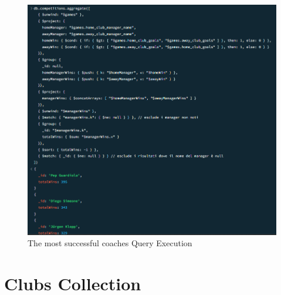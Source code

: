 \documentclass{Configuration_Files/PoliMi3i_thesis}
\begin{document}
\begin{figure}[htbp]
    \centering
    \includegraphics[scale=0.8]{Images/Queries/Competitions/most_succesful_coaches/msc.png}
    \caption{The most successful coaches Query Execution}
\end{figure}

\section{Clubs Collection}
\end{document}
